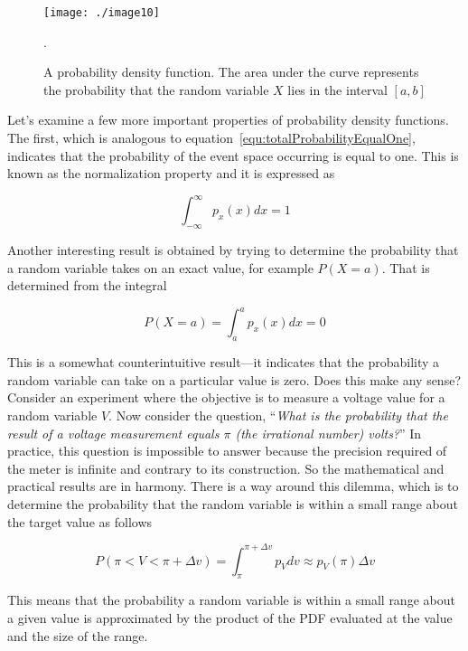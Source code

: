 \begin{figure}
\texttt{[image: ./image10]}
\caption{ A probability density function. The area under the
curve represents the probability that the random variable $X$ lies
in the interval $[ a,b ]$}.
\label{figure:probabilityDensityFunction}
\end{figure}

Let's examine a few more important properties of probability density
functions. The first, which is analogous to
equation~\ref{equ:totalProbabilityEqualOne}, indicates that the
probability of the event space occurring is equal to one. This is known
as the normalization property and it is expressed as

\begin{equation}
\label{equ:integralPDFequals1}
\int^{\infty}_{-\infty} p_x(x)dx = 1
\end{equation}

Another interesting result is obtained by trying to determine the
probability that a random variable takes on an exact value, for example
$P(X=a)$. That is determined from the
integral

\begin{equation}
\label{equ:integralSliceOfPDFequals0}
P(X=a) = \int^{a}_{a} p_x(x)dx = 0
\end{equation}

This is a somewhat counterintuitive result---it indicates that the
probability a random variable can take on a particular value is zero.
Does this make any sense? Consider an experiment where the objective is
to measure a voltage value for a random variable $V$. Now consider
the question, ``\emph{What is the probability that the result of a
voltage measurement equals $\pi$ (the irrational number) volts?}'' In
practice, this question is impossible to answer because the precision
required of the meter is infinite and contrary to its construction. So
the mathematical and practical results are in harmony. There is a way
around this dilemma, which is to determine the probability that the
random variable is within a small range about the target value as
follows

\begin{equation}
\label{equ:integralDeltaSliceOfPDF}
P(\pi < V < \pi+\Delta v) = \int^{\pi+\Delta v}_{\pi} p_V dv \approx p_V(\pi) \Delta v
\end{equation}

This means that the probability a random variable is within a small
range about a given value is approximated by the product of the PDF
evaluated at the value and the size of the range.

